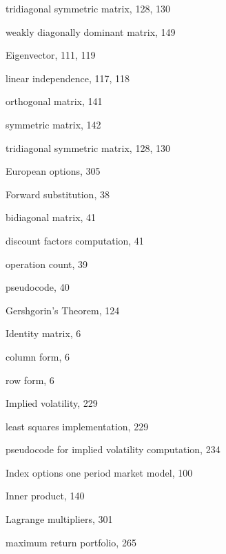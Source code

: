 {\noindent\hspace*{1.4em}tridiagonal symmetric matrix, 128, 130

\noindent\hspace*{1.4em}weakly diagonally dominant matrix, 149

\noindent Eigenvector, 111, 119

\noindent\hspace*{1.4em}linear independence, 117, 118

\noindent\hspace*{1.4em}orthogonal matrix, 141

\noindent\hspace*{1.4em}symmetric matrix, 142

\noindent\hspace*{1.4em}tridiagonal symmetric matrix, 128, 130

\noindent European options, 305

\medskip
\noindent Forward substitution, 38

\noindent\hspace*{1.4em}bidiagonal matrix, 41

\noindent\hspace*{1.4em}discount factors computation, 41

\noindent\hspace*{1.4em}operation count, 39

\noindent\hspace*{1.4em}pseudocode, 40

\medskip
\noindent Gershgorin's Theorem, 124

\medskip
\noindent Identity matrix, 6

\noindent\hspace*{1.4em}column form, 6

\noindent\hspace*{1.4em}row form, 6

\noindent Implied volatility, 229

\noindent\hspace*{1.4em}least squares implementation, 229

\noindent\hspace*{1.4em}pseudocode for implied volatility computation, 234

\noindent Index options one period market model, 100

\noindent Inner product, 140

\medskip
\noindent Lagrange multipliers, 301

\noindent\hspace*{1.4em}maximum return portfolio, 265

}
